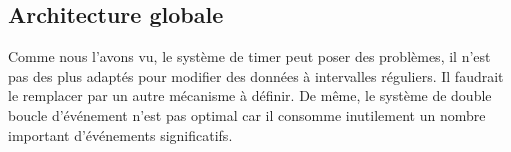 \subsection{Architecture globale}
Comme nous l'avons vu, le système de timer peut poser des problèmes, il n'est pas des plus adaptés pour modifier des données à intervalles réguliers. Il faudrait le remplacer par un autre mécanisme à définir. De même, le système de double boucle d'événement n'est pas optimal car il consomme inutilement un nombre important d'événements significatifs.
